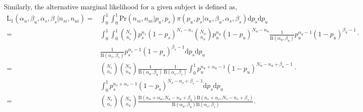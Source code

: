 \documentclass{article}
\begin{document}
\noindent Similarly, the alternative marginal likelihood for a given subject is defined as,
\[
\begin{split}
\mathrm{L_1}(\alpha_u,\beta_u,\alpha_s,\beta_s|n_{si},n_{ui}) =&\int_0^1\int_0^1 \mathrm{Pr}(n_{si},n_{ui}|p_u,p_s)\pi(p_u,p_s|\alpha_u,\beta_u,\alpha_s,\beta_s)\mathrm{d}p_s\mathrm{d}p_u \\
=&\int_0^1\int_0^1\binom{N_s}{n_s}p_s^{n_s}(1-p_s)^{N_s-n_s}\binom{N_u}{n_u}p_u^{n_u}(1-p_u)^{N_u-n_u}\frac{1}{\mathrm{B}(\alpha_u,\beta_u)}p_u^{\alpha_u-1}(1-p_u)^{\beta_u-1} \cdot\\ 
&\frac{1}{\mathrm{B}(\alpha_s,\beta_s)}p_s^{\alpha_s-1}(1-p_s)^{\beta_s-1} \mathrm{d}p_s\mathrm{d}p_u\\
=&\binom{N_s}{n_s}\binom{N_u}{n_u}\frac{1}{\mathrm{B}(\alpha_u,\beta_u)}\frac{1}{\mathrm{B}(\alpha_s,\beta_s)}\int_0^1 p_u^{n_u+\alpha_u-1}(1-p_u)^{N_u-n_u+\beta_u-1} \cdot\\
&\int_0^1 p_s^{n_s+\alpha_s-1}(1-p_s)^{N_s-n_s+\beta_s-1}\mathrm{d}p_s\mathrm{d}p_u \\
=&\binom{N_s}{n_s}\binom{N_u}{n_u}\frac{\mathrm{B}(n_u+\alpha_u,N_u-n_u+\beta_u)\mathrm{B}(n_s+\alpha_s,N_s-n_s+\beta_s)}{\mathrm{B}(\alpha_u,\beta_u)\mathrm{B}(\alpha_s,\beta_s)}.
\end{split}
\]
\end{document}

